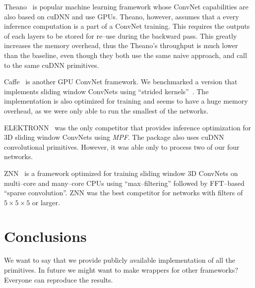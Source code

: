 \documentclass[conference]{./IEEEtran/IEEEtran}
\begin{document}
  Theano~\cite{bergstra2010theano} is popular machine learning
  framework whose ConvNet capabilities are also based on cuDNN and use
  GPUs.  Theano, however, assumes that a every inference computation
  is a part of a ConvNet training.  This requires the outputs of each
  layers to be stored for re--use during the backward pass.  This
  greatly increases the memory overhead, thus the Theano's throughput
  is much lower than the baseline, even though they both use the same
  naive approach, and call to the same cuDNN primitives.

  Caffe~\cite{jia2014caffe} is another GPU ConvNet framework.  We
  benchmarked a version that implements sliding window ConvNets
  using ``strided kernels''~\cite{tschopp2015efficient}.  The
  implementation is also optimized for training and seems to have a
  huge memory overhead, as we were only able to run the smallest of
  the networks.

  ELEKTRONN~\cite{ELEKTRON2015} was the only competitor that provides
  inference optimization for 3D sliding window ConvNets using
  \emph{MPF}.  The package also uses cuDNN convolutional primitives.
  However, it was able only to process two of our four networks.

  ZNN~\cite{zlateski2015znn} is a framework optimized for training
  sliding window 3D ConvNets on multi--core and many--core CPUs using
  ``max--filtering'' followed by FFT--based ``sparse convolution''.
  ZNN was the best competitor for networks with filters of $5 \times 5
  \times 5$ or larger.



\section{Conclusions}

  We want to say that we provide publicly available implementation of
  all the primitives.  In future we might want to make wrappers for
  other frameworks?  Everyone can reproduce the results.





\end{document}
